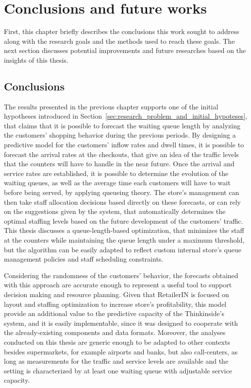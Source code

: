 \chapter{Conclusions and future works}
\label{cha:conclusions_and_future_works}

First, this chapter briefly describes the conclusions this work sought to address along with the research goals and the methods used to reach these goals. The next section discusses potential improvements and future researches based on the insights of this thesis.

\section{Conclusions}
\label{sec:conclusions}

The results presented in the previous chapter supports one of the initial hypotheses introduced in Section~\ref{sec:research_problem_and_initial_hypoteses}, that claims that it is possible to forecast the waiting queue length by analyzing the customers’ shopping behavior during the previous periods. By designing a predictive model for the customers’ inflow rates and dwell times, it is possible to forecast the arrival rates at the checkouts, that give an idea of the traffic levels that the counters will have to handle in the near future. Once the arrival and service rates are established, it is possible to determine the evolution of the waiting queues, as well as the average time each customers will have to wait before being served, by applying queueing theory. The store’s management can then take staff allocation decisions based directly on these forecasts, or can rely on the suggestions given by the system, that automatically determines the optimal staffing levels based on the future development of the customers' traffic. This thesis discusses a queue-length-based optimization, that minimizes the staff at the counters while maintaining the queue length under a maximum threshold, but the algorithm can be easily adapted to reflect custom internal store’s queue management policies and staff scheduling constraints.

Considering the randomness of the customers’ behavior, the forecasts obtained with this approach are accurate enough to represent a useful tool to support decision making and resource planning. Given that RetailerIN is focused on layout and staffing optimization to increase store’s profitability, this model provide an additional value to the predictive capacity of the Thinkinside’s system, and it is easily implementable, since it was designed to cooperate with the already-existing components and data formats. Moreover, the analyses conducted on this thesis are generic enough to be adapted to other contexts besides supermarkets, for example airports and banks, but also call-centers, as long as measurements for the traffic and service levels are available and the setting is characterized by at least one waiting queue with adjustable service capacity.

